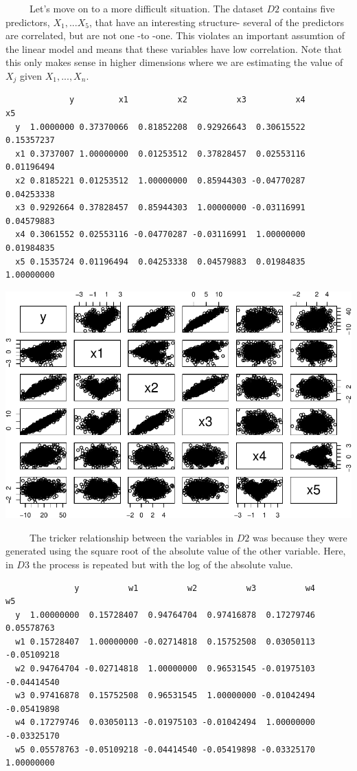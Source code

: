 \documentclass[12pt,twoside]{reedthesis}
\begin{document}
  ~~~~~Let's move on to a more difficult situation. The dataset \(D2\)
  contains five predictors, \(X_1,...X_5\), that have an interesting
  structure- several of the predictors are correlated, but are not one -to
  -one. This violates an important assumtion of the linear model and means
  that these variables have low correlation. Note that this only makes
  sense in higher dimensions where we are estimating the value of \(X_j\)
  given \(X_1,...,X_n\).
  
  \begin{verbatim}
             y         x1          x2          x3          x4         x5
  y  1.0000000 0.37370066  0.81852208  0.92926643  0.30615522 0.15357237
  x1 0.3737007 1.00000000  0.01253512  0.37828457  0.02553116 0.01196494
  x2 0.8185221 0.01253512  1.00000000  0.85944303 -0.04770287 0.04253338
  x3 0.9292664 0.37828457  0.85944303  1.00000000 -0.03116991 0.04579883
  x4 0.3061552 0.02553116 -0.04770287 -0.03116991  1.00000000 0.01984835
  x5 0.1535724 0.01196494  0.04253338  0.04579883  0.01984835 1.00000000
  \end{verbatim}
  
  \begin{center}\includegraphics{Thesis_files/figure-latex/sqrtAbs-1} \end{center}
  
  ~~~~~The tricker relationship between the variables in \(D2\) was
  because they were generated using the square root of the absolute value
  of the other variable. Here, in \(D3\) the process is repeated but with
  the log of the absolute value.
  
  \begin{verbatim}
              y          w1          w2          w3          w4          w5
  y  1.00000000  0.15728407  0.94764704  0.97416878  0.17279746  0.05578763
  w1 0.15728407  1.00000000 -0.02714818  0.15752508  0.03050113 -0.05109218
  w2 0.94764704 -0.02714818  1.00000000  0.96531545 -0.01975103 -0.04414540
  w3 0.97416878  0.15752508  0.96531545  1.00000000 -0.01042494 -0.05419898
  w4 0.17279746  0.03050113 -0.01975103 -0.01042494  1.00000000 -0.03325170
  w5 0.05578763 -0.05109218 -0.04414540 -0.05419898 -0.03325170  1.00000000
  \end{verbatim}
  
\end{document}
